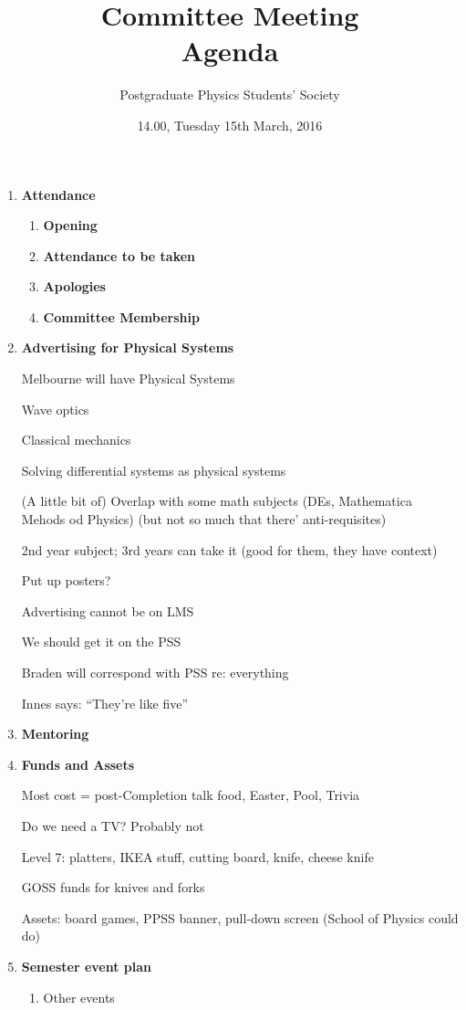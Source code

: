 \documentclass[a4paper,12pt]{article}
\title{Committee Meeting\\Agenda}
\author{Postgraduate Physics Students' Society}
\date{14.00, Tuesday 15th March, 2016}
\newcommand{\itemi}[1]{\bf\large #1}
\newcommand{\itemii}[1]{\bf #1}
\begin{document}
\thispagestyle{empty}\pagestyle{empty}
\maketitle
\begin{enumerate}
\item {\itemi Attendance}
	\begin{enumerate}
	\item {\itemii Opening}
	\item {\itemii Attendance to be taken}
	\item {\itemii Apologies}
	\item {\itemii Committee Membership}
	\end{enumerate}
\item {\itemi Advertising for Physical Systems}

Melbourne will have Physical Systems

Wave optics

Classical mechanics

Solving differential systems as physical systems

(A little bit of) Overlap with some math subjects (DEs, Mathematica Mehods od Physics) (but not so much that there' anti-requisites)

2nd year subject; 3rd years can take it (good for them, they have context)

Put up posters?

Advertising cannot be on LMS

We should get it on the PSS

Braden will correspond with PSS re: everything

Innes says: ``They're like five''
\item {\itemi Mentoring}
\item {\itemi Funds and Assets}

Most cost = post-Completion talk food, Easter, Pool, Trivia

Do we need a TV? Probably not

Level 7: platters, IKEA stuff, cutting board, knife, cheese knife

GOSS funds for knives and forks

Assets: board games, PPSS banner, pull-down screen (School of Physics could do)


\item {\itemi Semester event plan}
	\begin{enumerate}
	\item Other events
		

\end{enumerate}
\end{enumerate}
\end{document}
